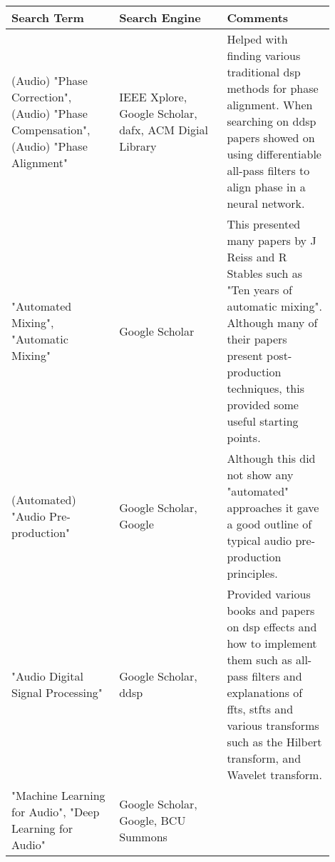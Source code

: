         \begin{longtable}[H]{|p{0.3\linewidth}|p{0.3\linewidth}|p{0.3\linewidth}|}
            \hline
            Search Term &
              Search Engine &
              Comments \\ \hline
            \endfirsthead
            \endhead
            (Audio) "Phase Correction",\newline
            (Audio) "Phase Compensation",\newline
            (Audio) "Phase Alignment" &
              IEEE Xplore,\newline
              Google Scholar,\newline
              \acrshort{dafx},\newline
              ACM Digial Library &
              Helped with finding various traditional \acrshort{dsp} methods for phase alignment. When searching on \acrshort{ddsp} papers showed on using differentiable all-pass filters to align phase in a neural network. \\ \hline
            "Automated Mixing",\newline
            "Automatic Mixing" &
              Google Scholar &
              This presented many papers by J Reiss and R Stables such as "Ten years of automatic mixing". Although many of their papers present post-production techniques, this provided some useful starting points. \\ \hline
            (Automated) "Audio Pre-production" &
              Google Scholar,\newline
              Google &
              Although this did not show any "automated" approaches it gave a good outline of typical audio pre-production principles. \\ \hline
            "Audio Digital Signal Processing" &
              Google Scholar,\newline
              \acrshort{ddsp} &
              Provided various books and papers on \acrshort{dsp} effects and how to implement them such as all-pass filters and explanations of \acrshort{fft}s, \acrshort{stft}s and various transforms such as the Hilbert transform, and Wavelet transform. \\ \hline
            "Machine Learning for Audio",\newline
            "Deep Learning for Audio" &
              Google Scholar,\newline
              Google,\newline
              BCU Summons &

\end{longtable}
